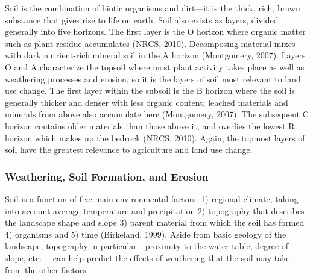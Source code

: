 \documentclass{book}\usepackage{knitr}
\begin{document}
Soil is the combination of biotic organisms and dirt—it is the thick, rich, brown substance that gives rise to life on earth. Soil also exists as layers, divided generally into five horizons. The first layer is the O horizon where organic matter such as plant residue accumulates (NRCS, 2010). Decomposing material mixes with dark nutrient-rich mineral soil in the A horizon (Montgomery, 2007). Layers O and A characterize the topsoil where most plant activity takes place as well as weathering processes and erosion, so it is the layers of soil most relevant to land use change. The first layer within the subsoil is the B horizon where the soil is generally thicker and denser with less organic content; leached materials and minerals from above also accumulate here (Montgomery, 2007). The subsequent C horizon contains older materials than those above it, and overlies the lowest R horizon which makes up the bedrock (NRCS, 2010). Again, the topmost layers of soil have the greatest relevance to agriculture and land use change.

\subsubsection{Weathering, Soil Formation, and Erosion}

Soil is a function of five main environmental factors: 1) regional climate, taking into account average temperature and precipitation 2) topography that describes the landscape shape and slope 3) parent material from which the soil has formed 4) organisms and 5) time (Birkeland, 1999). Aside from basic geology of the landscape, topography in particular—proximity to the water table, degree of slope, etc.— can help predict the effects of weathering that the soil may take from the other factors.
\end{document}
